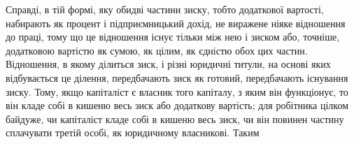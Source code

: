 Справді, в тій формі, яку обидві частини зиску, тобто додаткової
вартості, набирають як процент і підприємницький дохід,
не виражене ніяке відношення до праці, тому що це відношення
існує тільки між нею і зиском або, точніше, додатковою вартістю
як сумою, як цілим, як єдністю обох цих частин. Відношення, в
якому ділиться зиск, і різні юридичні титули, на основі яких відбувається
це ділення, передбачають зиск як готовий, передбачають
існування зиску. Тому, якщо капіталіст є власник того капіталу,
з яким він функціонує, то він кладе собі в кишеню весь зиск
або додаткову вартість; для робітника цілком байдуже, чи капіталіст
кладе собі в кишеню весь зиск, чи він повинен частину
сплачувати третій особі, як юридичному власникові. Таким
\parbreak{}  %
